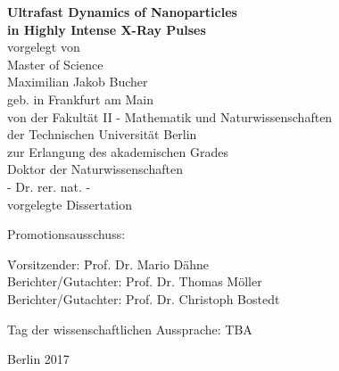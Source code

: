 %
\begin{fullsizetitle}
\vspace{40mm}
\begin{center}
%
{\LARGE \textbf{Ultrafast Dynamics of Nanoparticles\\in Highly Intense X-Ray Pulses\vspace{20mm}\\}}%
{\large%
vorgelegt von
\vspace{4mm}\\
Master of Science}%
\vspace{2mm}\\
%
{\Large Maximilian Jakob Bucher}
\vspace{4mm}\\
%
{\large geb. in Frankfurt am Main} %
\vspace{20mm}
\\
%
{\large %
von der Fakult\"{a}t II - Mathematik und Naturwissenschaften
\vspace{1mm}\\
der Technischen Universit\"{a}t Berlin
\vspace{1mm}\\
zur Erlangung des akademischen Grades
%
\vspace{5mm}
\\
%
Doktor der Naturwissenschaften
\vspace{1mm}\\
- Dr. rer. nat. -
%
\vspace{10mm}
\\
%
%
vorgelegte Dissertation
\vspace{10mm}}
\\
\end{center}
%
{\large%
\hspace{22mm}Promotionsausschuss:
%
%
\begin{tabbing}
%
\hspace{22mm}\= Vorsitzender:\hspace{20mm} \= Prof. Dr. Mario D\"{a}hne \\
\>Berichter/Gutachter: \> Prof. Dr. Thomas M\"{o}ller \\
\>Berichter/Gutachter: \> Prof. Dr. Christoph Bostedt
%
\end{tabbing}
%
\leavevmode
\hspace{22mm}Tag der wissenschaftlichen Aussprache: TBA%
}
%
\begin{center}
%
\vspace{20mm}
%
{\large %
Berlin 2017}
%
\end{center}
%
\end{fullsizetitle}
%
%